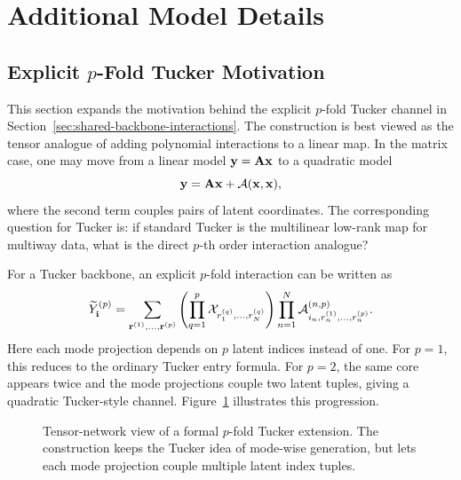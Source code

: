 \section{Additional Model Details}
\label{app:model-details}

\subsection{\texorpdfstring{Explicit \(p\)-Fold Tucker Motivation}{Explicit p-Fold Tucker Motivation}}
\label{app:pfold-tucker-motivation}

This section expands the motivation behind the explicit \(p\)-fold Tucker
channel in Section~\ref{sec:shared-backbone-interactions}. The construction is
best viewed as the tensor analogue
of adding polynomial interactions to a linear map. In the matrix case, one may
move from a linear model \(\mathbf{y}=\mathbf{A}\mathbf{x}\) to a quadratic model
\[
  \mathbf{y}=\mathbf{A}\mathbf{x}+\mathcal{A}(\mathbf{x},\mathbf{x}),
\]
where the second term couples pairs of latent coordinates. The corresponding
question for Tucker is: if standard Tucker is the multilinear low-rank map for
multiway data, what is the direct \(p\)-th order interaction analogue?

For a Tucker backbone, an explicit \(p\)-fold interaction can be written as
\begin{equation}
  \widetilde Y^{(p)}_{\mathbf i}
  =
  \sum_{\mathbf r^{(1)},\ldots,\mathbf r^{(p)}}
  \left(
  \prod_{q=1}^{p}
  \mathcal{X}_{r_1^{(q)},\ldots,r_N^{(q)}}
  \right)
  \prod_{n=1}^{N}
  \mathcal{A}^{(n,p)}_{i_n,r_n^{(1)},\ldots,r_n^{(p)}} .
  \label{eq:appendix-explicit-pfold-tucker}
\end{equation}
Here each mode projection depends on \(p\) latent indices instead of one.
For \(p=1\), this reduces to the ordinary Tucker entry formula. For \(p=2\),
the same core appears twice and the mode projections couple two latent tuples,
giving a quadratic Tucker-style channel. Figure~\ref{fig:pfold-tucker-network}
illustrates this progression.

\begin{figure}[ht]
  \centering
  \resizebox{\linewidth}{!}{}
  \caption{Tensor-network view of a formal \(p\)-fold Tucker extension. The
  construction keeps the Tucker idea of mode-wise generation, but lets each
  mode projection couple multiple latent index tuples.}
  \label{fig:pfold-tucker-network}
\end{figure}

